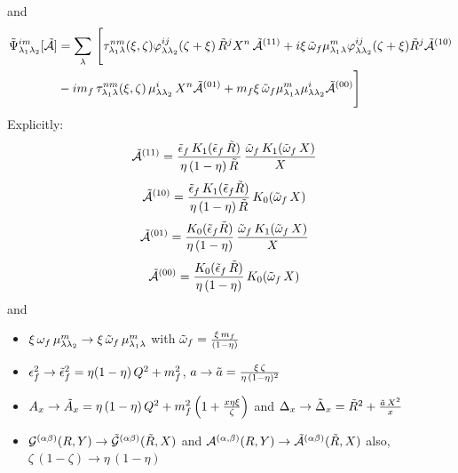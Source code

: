 \documentclass[9pt]{article}
\numberwithin{equation}{section}
\begin{document}
and
\begin{align}
  \Tilde{\Psi}^{im}_{\lambda_{1}\lambda_{2}}[\mathcal{\Tilde{A}}] & = \sum_{\lambda}\, \Bigg[\tau^{nm}_{\lambda_{1}\lambda}(\xi,\zeta)\varphi^{ij}_{\lambda\lambda_{2}}(\zeta + \xi)\,\Tilde{R}^{j}X^{n}\,\mathcal{\Tilde{A}}^{(11)}+i\xi\,\Tilde{\omega}_{f}\mu^{m}_{\lambda_{1}\lambda}\varphi^{ij}_{\lambda\lambda_{2}}(\zeta + \xi)\Tilde{R}^{j}\mathcal{\Tilde{A}}^{(10)}\notag \\ & -im_{f}\,\tau^{nm}_{\lambda_{1}\lambda}(\xi,\zeta)\,\mu^{i}_{\lambda\lambda_{2}}\,X^{n}\mathcal{\Tilde{A}}^{(01)} + m_{f}\xi\,\Tilde{\omega}_{f}\mu^{m}_{\lambda_{1}\lambda}\mu^{i}_{\lambda\lambda_{2}}\mathcal{\Tilde{A}}^{(00)}\Bigg]
\end{align}
Explicitly: 
\begin{align}
    \mathcal{\Tilde{A}}^{(11)} & = \frac{\Tilde{\epsilon}_{f}\,K_{1}(\Tilde{\epsilon}_{f}\,\Tilde{R})}{\eta\,(1-\eta)\,\Tilde{R}}\, \frac{\Tilde{\omega}_{f}\,K_{1}(\Tilde{\omega}_{f}\,X)}{X}
\end{align}
\begin{align}
    \mathcal{\Tilde{A}}^{(10)} & = \frac{\Tilde{\epsilon}_{f}\,K_{1}(\Tilde{\epsilon}_{f}\Tilde{R})}{\eta\,(1-\eta)\,\Tilde{R}}\, K_{0}(\Tilde{\omega}_{f}\,X)
\end{align}
\begin{align}
    \mathcal{\Tilde{A}}^{(01)} & =   \frac{K_{0}(\Tilde{\epsilon}_{f}\Tilde{R})}{\eta\,(1-\eta)}\,\frac{\Tilde{\omega}_{f}\,K_{1}(\Tilde{\omega}_{f}\,X)}{X}
\end{align}
\begin{align}
    \mathcal{\Tilde{A}}^{(00)} & = \frac{K_{0}(\Tilde{\epsilon}_{f}\,\Tilde{R})}{\eta\,(1-\eta)}\, K_{0}(\Tilde{\omega}_{f}\,X)
\end{align}
and 
\begin{itemize}
 \item $\xi\, \omega_{f}\,\mu^{m}_{\lambda\lambda_{2}} \rightarrow \xi\, \Tilde{\omega}_{f}\,\mu^{m}_{\lambda_{1}\lambda}$ with $\Tilde{\omega}_{f} = \frac{\xi\,m_{f}}{(1-\eta)}$
    \item $\epsilon^{2}_{f} \rightarrow \Tilde{\epsilon}^{2}_{f} = \eta(1-\eta)\, Q^{2} + m^{2}_{f}$, $a \rightarrow \Tilde{a} = \frac{\xi\,\zeta}{\eta\, (1-\eta)^{2}}$
    \item $A_{x} \rightarrow \Tilde{A}_{x} = \eta\,(1-\eta)\,Q^{2} + m^{2}_{f}\left(1+\frac{x\eta\xi}{\zeta}\right)$ and $\Delta_{x} \rightarrow \Tilde{\Delta}_{x} = \Tilde{R}^{2} + \frac{\Tilde{a}\,X^{2}}{x}$
    \item $\mathcal{G}^{(\alpha\beta)}(R,Y) \rightarrow \mathcal{\Tilde{G}}^{(\alpha\beta)}(\Tilde{R},X) $ and $\mathcal{A}^{(\alpha,\beta)}(R,Y) \rightarrow \mathcal{\Tilde{A}}^{(\alpha\beta)}(\Tilde{R},X)$ also, $\zeta\,(1-\zeta) \rightarrow \eta\,(1-\eta)$
\end{itemize}
\end{document}
